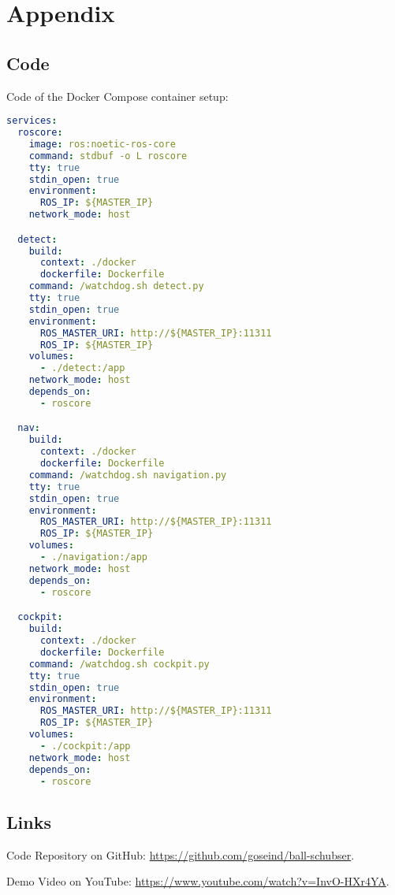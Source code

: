 \section{Appendix}
\subsection{Code}

Code of the Docker Compose container setup:

{\scriptsize
\begin{lstlisting}[language=yaml,frame=single,caption=docker-compose.yml,label=code:compose]
services:
  roscore:
    image: ros:noetic-ros-core
    command: stdbuf -o L roscore
    tty: true
    stdin_open: true
    environment:
      ROS_IP: ${MASTER_IP}
    network_mode: host

  detect:
    build:
      context: ./docker
      dockerfile: Dockerfile
    command: /watchdog.sh detect.py
    tty: true
    stdin_open: true
    environment:
      ROS_MASTER_URI: http://${MASTER_IP}:11311
      ROS_IP: ${MASTER_IP}
    volumes:
      - ./detect:/app
    network_mode: host
    depends_on:
      - roscore

  nav:
    build:
      context: ./docker
      dockerfile: Dockerfile
    command: /watchdog.sh navigation.py
    tty: true
    stdin_open: true
    environment:
      ROS_MASTER_URI: http://${MASTER_IP}:11311
      ROS_IP: ${MASTER_IP}
    volumes:
      - ./navigation:/app
    network_mode: host
    depends_on:
      - roscore

  cockpit:
    build:
      context: ./docker
      dockerfile: Dockerfile
    command: /watchdog.sh cockpit.py
    tty: true
    stdin_open: true
    environment:
      ROS_MASTER_URI: http://${MASTER_IP}:11311
      ROS_IP: ${MASTER_IP}
    volumes:
      - ./cockpit:/app
    network_mode: host
    depends_on:
      - roscore
\end{lstlisting}
}

\subsection{Links}
\noindent
Code Repository on GitHub: \url{https://github.com/goseind/ball-schubser}.
\newline

\noindent
Demo Video on YouTube: \url{https://www.youtube.com/watch?v=InvO-HXr4YA}.